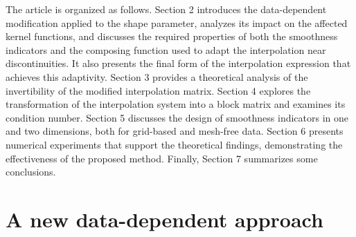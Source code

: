 \documentclass[preprint]{elsarticle}       %
\begin{document}
The article is organized as follows. Section 2 introduces the data-dependent modification applied to the shape parameter, analyzes its impact on the affected kernel functions, and discusses the required properties of both the smoothness indicators and the composing function used to adapt the interpolation near discontinuities. It also presents the final form of the interpolation expression that achieves this adaptivity. Section 3 provides a theoretical analysis of the invertibility of the modified interpolation matrix. Section 4 explores the transformation of the interpolation system into a block matrix and examines its condition number. %
Section 5 discusses the design of smoothness indicators in one and two dimensions, both for grid-based and mesh-free data. Section 6 presents numerical experiments that support the theoretical findings, demonstrating the effectiveness of the proposed method. Finally, Section 7 summarizes some conclusions.

%
%
%
%
%
%
%
%

\section{A new data-dependent approach}
\end{document}
